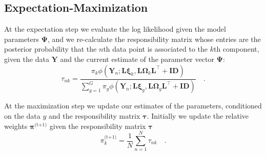\documentclass[twocolumn]{aastex61}
\newcommand{\vect}[1]{\boldsymbol{\mathbf{#1}}}
\renewcommand{\vec}[1]{\vect{#1}}
\newcommand{\weight}{\pi}
\newcommand{\data}{\textbf{Y}}
\newcommand{\vecdata}{\vec\data}
\newcommand{\nextstep}{^\textrm{(t+1)}}
\newcommand{\thisstep}{^\textrm{(t)}}
\newcommand{\transpose}{^\intercal}
\newcommand{\eye}{\textbf{I}}
\newcommand{\factorloads}{\textbf{L}}
\newcommand{\specificvariance}{\vec{D}}
\newcommand{\scoremeans}{\vec\xi}
\newcommand{\scorecovs}{\vec\Omega}
\begin{document}
\subsection{Expectation-Maximization}

At the expectation step we evaluate the log likelihood
given the model parameters $\vec\Psi$, and we re-calculate the responsibility
matrix whose entries are the posterior probability
that the $n$th data point is associated to the $k$th component,
given the data $\vecdata$ and the current estimate of the 
parameter vector $\vec\Psi$:
\begin{equation}
	\tau_{nk} = \frac{\weight_k\phi(\vecdata_n;\factorloads\scoremeans_k, \factorloads\scorecovs_k\factorloads\transpose + \eye\specificvariance)}{\sum_{g=1}^{G}\weight_g\phi(\vecdata_n;\factorloads\scoremeans_g, \factorloads\scorecovs_g\factorloads\transpose + \eye\specificvariance)} \quad .
\end{equation}






At the maximization step we update our estimates of the parameters,
conditioned on the data $y$ and the responsibility matrix $\vec\tau$.
Initially we update the relative weights $\vec\weight\nextstep$ given
the responsibility matrix $\vec\tau$
\begin{equation}
	\weight_k\nextstep = \frac{1}{N} \sum_{n=1}^{N}\tau_{nk} \quad .
\end{equation}


\end{document}
